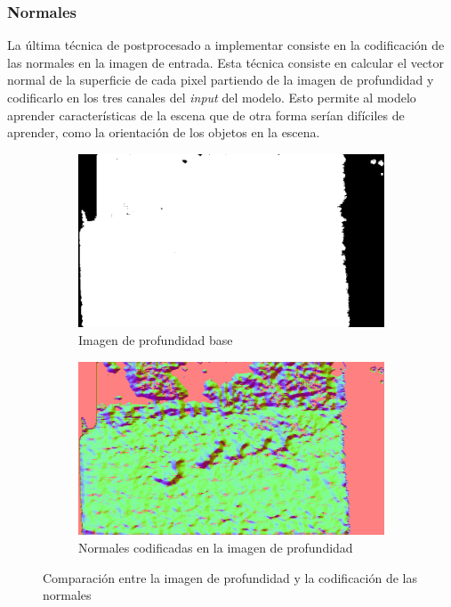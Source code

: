 \documentclass[12pt,a4paper]{report}
\begin{document}
\subsubsection{Normales}
\label{subsubsec:normals}
La última técnica de postprocesado a implementar consiste en la codificación de las normales en la imagen de entrada. Esta técnica consiste en calcular el vector normal de la superficie de cada pixel partiendo de la imagen de profundidad y codificarlo en los tres canales del \textit{input} del modelo. Esto permite al modelo aprender características de la escena que de otra forma serían difíciles de aprender, como la orientación de los objetos en la escena.
\begin{figure}[!h]
    \centering
    \begin{subfigure}{0.45\textwidth}
        \centering
        \includegraphics[width=\textwidth]{media/data/depth_gueese.png}
        \caption{Imagen de profundidad base}
    \end{subfigure}
    \hfill
    \begin{subfigure}{0.45\textwidth}
        \centering
        \includegraphics[width=\textwidth]{media/data/normal_gueese.png}
        \caption{Normales codificadas en la imagen de profundidad}
    \end{subfigure}
    \caption{Comparación entre la imagen de profundidad y la codificación de las normales}
    \label{fig:depth-normals-comparison}
\end{figure}
\end{document}
